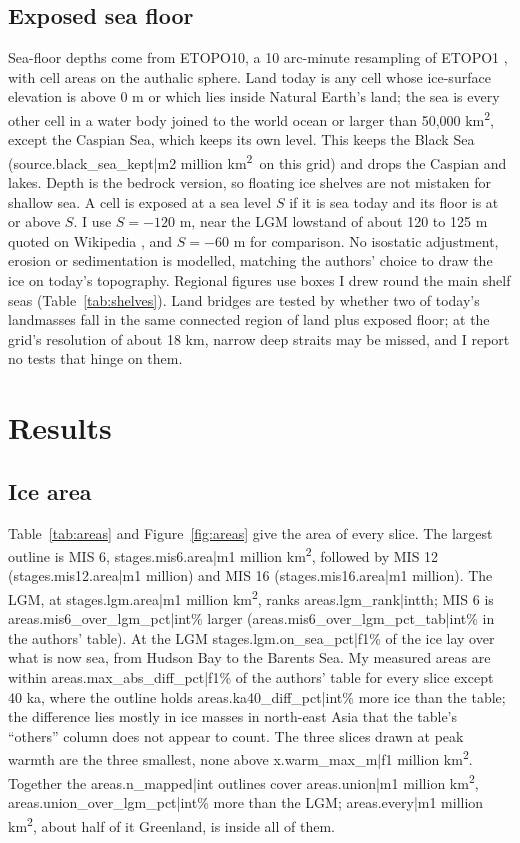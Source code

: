 \documentclass[11pt,a4paper]{article}
\newcommand{\kmq}{km\textsuperscript{2}}
\begin{document}
\subsection{Exposed sea floor}
Sea-floor depths come from ETOPO10, a 10 arc-minute resampling of ETOPO1 \citep{etopo1}, with cell areas on the authalic sphere. Land today is any cell whose ice-surface elevation is above 0 m or which lies inside Natural Earth's land; the sea is every other cell in a water body joined to the world ocean or larger than 50,000 \kmq, except the Caspian Sea, which keeps its own level. This keeps the Black Sea ({{source.black_sea_kept|m2}} million \kmq\ on this grid) and drops the Caspian and lakes. Depth is the bedrock version, so floating ice shelves are not mistaken for shallow sea. A cell is exposed at a sea level $S$ if it is sea today and its floor is at or above $S$. I use $S=-120$ m, near the LGM lowstand of about 120 to 125 m quoted on Wikipedia \citep{wiki}, and $S=-60$ m for comparison. No isostatic adjustment, erosion or sedimentation is modelled, matching the authors' choice to draw the ice on today's topography. Regional figures use boxes I drew round the main shelf seas (Table~\ref{tab:shelves}). Land bridges are tested by whether two of today's landmasses fall in the same connected region of land plus exposed floor; at the grid's resolution of about 18 km, narrow deep straits may be missed, and I report no tests that hinge on them.

\section{Results}
\subsection{Ice area}
Table~\ref{tab:areas} and Figure~\ref{fig:areas} give the area of every slice. The largest outline is MIS 6, {{stages.mis6.area|m1}} million \kmq, followed by MIS 12 ({{stages.mis12.area|m1}} million) and MIS 16 ({{stages.mis16.area|m1}} million). The LGM, at {{stages.lgm.area|m1}} million \kmq, ranks {{areas.lgm_rank|int}}th; MIS 6 is {{areas.mis6_over_lgm_pct|int}}\% larger ({{areas.mis6_over_lgm_pct_tab|int}}\% in the authors' table). At the LGM {{stages.lgm.on_sea_pct|f1}}\% of the ice lay over what is now sea, from Hudson Bay to the Barents Sea. My measured areas are within {{areas.max_abs_diff_pct|f1}}\% of the authors' table for every slice except 40 ka, where the outline holds {{areas.ka40_diff_pct|int}}\% more ice than the table; the difference lies mostly in ice masses in north-east Asia that the table's ``others'' column does not appear to count. The three slices drawn at peak warmth are the three smallest, none above {{x.warm_max_m|f1}} million \kmq. Together the {{areas.n_mapped|int}} outlines cover {{areas.union|m1}} million \kmq, {{areas.union_over_lgm_pct|int}}\% more than the LGM; {{areas.every|m1}} million \kmq, about half of it Greenland, is inside all of them.
\end{document}
